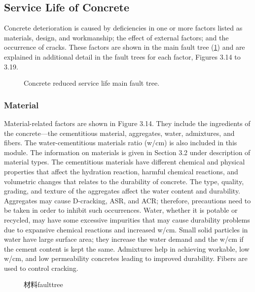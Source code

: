 \subsection{Service Life of Concrete}
Concrete deterioration is caused by deficiencies in one or more factors listed as materials, design, and workmanship; the effect of external factors; and the occurrence of cracks. These factors are shown in the main fault tree (\cref{fig:faulttree-concrete-reduced-main}) and are explained in additional detail in the fault trees for each factor, Figures 3.14 to 3.19.

\begin{figure}
  \caption{Concrete reduced service life main fault tree.}
  \label{fig:faulttree-concrete-reduced-main}
\end{figure}


\subsubsection{Material}
Material-related factors are shown in Figure 3.14. They include the ingredients of the concrete—the
cementitious material, aggregates, water, admixtures, and fibers. The water-cementitious materials ratio (w/cm) is
also included in this module. The information on materials is given in Section 3.2 under description of material
types. The cementitious materials have different chemical and physical properties that affect the hydration reaction,
harmful chemical reactions, and volumetric changes that relates to the durability of concrete. The type, quality,
grading, and texture of the aggregates affect the water content and durability. Aggregates may cause D-cracking,
ASR, and ACR; therefore, precautions need to be taken in order to inhibit such occurrences. Water, whether it is
potable or recycled, may have some excessive impurities that may cause durability problems due to expansive
chemical reactions and increased w/cm. Small solid particles in water have large surface area; they increase the water demand and the w/cm if the cement content is kept the same. Admixtures help in achieving workable, low w/cm, and
low permeability concretes leading to improved durability. Fibers are used to control cracking.

\begin{figure}
  \caption{材料\gls*{faulttree}}
  \label{fig:fault-tree-material}
\end{figure}

